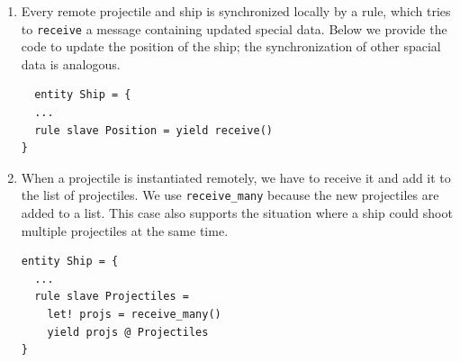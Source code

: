\begin{enumerate}
	\item Every remote projectile and ship is synchronized locally by a rule, which tries to \texttt{receive} a message containing updated special data. Below we provide the code to update the position of the ship; the synchronization of other spacial data is analogous.
	
\begin{lstlisting}
  entity Ship = {
  ...
  rule slave Position = yield receive()
}
\end{lstlisting}
	
	\item When a projectile is instantiated remotely, we have to receive it and add it to the list of projectiles. We use \texttt{receive\_many} because the new projectiles are added to a list. This case also supports the situation where a ship could shoot multiple projectiles at the same time.
	
\begin{lstlisting}
entity Ship = {
  ...
  rule slave Projectiles =
    let! projs = receive_many()
    yield projs @ Projectiles
}
\end{lstlisting} 
\end{enumerate}


